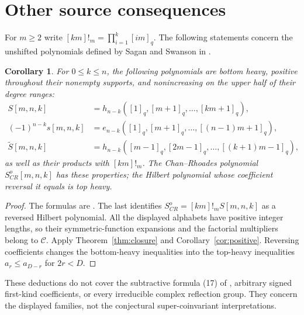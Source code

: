 \documentclass[11pt]{article}
\newtheorem{corollary}[lemma]{Corollary}
\newcommand{\qi}[1]{[#1]_q}
\begin{document}
\section{Other source consequences}
For $m\ge2$ write $[km]!_m=\prod_{i=1}^k\qi{im}$.
The following statements concern the unshifted polynomials defined by
Sagan and Swanson in \cite{Complex}.
\begin{corollary}\label{cor:complex}
For $0\le k\le n$, the following polynomials are bottom heavy,
positive throughout their nonempty supports, and nonincreasing on
the upper half of their degree ranges:
\begin{align*}
 S[m,n,k]&=h_{n-k}(\qi1,\qi{m+1},\ldots,\qi{km+1}),\\
 (-1)^{n-k}s[m,n,k]&=e_{n-k}(\qi1,\qi{m+1},\ldots,\qi{(n-1)m+1}),\\
 \widetilde S[m,n,k]&=h_{n-k}(\qi{m-1},\qi{2m-1},\ldots,\qi{(k+1)m-1}),
\end{align*}
as well as their products with $[km]!_m$.
The Chan--Rhoades polynomial $S^o_{CR}[m,n,k]$ has these properties;
the Hilbert polynomial whose coefficient reversal it equals is top heavy.
\end{corollary}
\begin{proof}
The formulas are \cite[Theorem 3.2(16), Section 6.1,
equation (20), and Proposition 5.10]{Complex}.
The last identifies $S^o_{CR}=[km]!_m S[m,n,k]$ as a reversed Hilbert
polynomial. All the displayed alphabets have positive integer lengths,
so their symmetric-function expansions and the factorial multipliers
belong to $\mathcal C$. Apply Theorem~\ref{thm:closure} and
Corollary~\ref{cor:positive}. Reversing coefficients changes the
bottom-heavy inequalities into the top-heavy inequalities
$a_r\le a_{D-r}$ for $2r<D$.
\end{proof}

These deductions do not cover the subtractive formula (17) of
\cite{Complex}, arbitrary signed first-kind coefficients, or every
irreducible complex reflection group. They concern the displayed
families, not the conjectural super-coinvariant interpretations.
\end{document}
